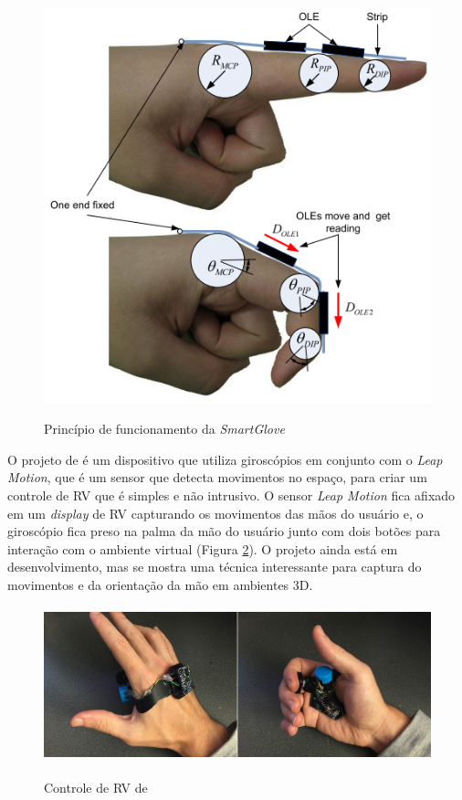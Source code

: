 \begin{figure}[H]
  \setlength{\abovecaptionskip}{0pt}
  \setlength{\belowcaptionskip}{0pt}
  \caption[Princípio de funcionamento da \textit{SmartGlove}]{Princípio de funcionamento da \textit{SmartGlove}}
  \centering
  \includegraphics[width=.5\textwidth]{imagem/2009smartglove}
  \captionsetup{justification=centering}
  \label{fig:2009smartglove}
\end{figure}

O projeto de  é um dispositivo que utiliza giroscópios em conjunto com o \textit{Leap Motion}, que é um sensor que detecta movimentos no espaço, para criar um controle de \ac{RV} que é simples e não intrusivo. O sensor \textit{Leap Motion} fica afixado em um \textit{display} de \acl{RV} capturando os movimentos das mãos do usuário e, o giroscópio fica preso na palma da mão do usuário junto com dois botões para interação com o ambiente virtual (Figura \ref{fig:leap}). O projeto ainda está em desenvolvimento, mas se mostra uma técnica interessante para captura do movimentos e da orientação da mão em ambientes \ac{3D}.

\begin{figure}[H]
  \setlength{\abovecaptionskip}{0pt}
  \setlength{\belowcaptionskip}{0pt}
  \caption[Controle de \ac{RV}]{Controle de \ac{RV} de }
  \centering
  \includegraphics[height=4.5cm]{imagem/leap}
  \captionsetup{justification=centering}
  \label{fig:leap}
\end{figure}

